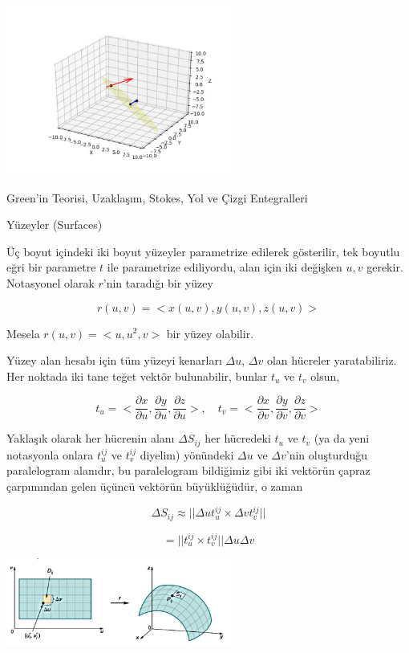 \documentclass[12pt,fleqn]{article}\usepackage{../../common}
\begin{document}
\includegraphics[width=20em]{calc_multi_75_app_07.jpg}

Green'in Teorisi, Uzaklaşım, Stokes, Yol ve Çizgi Entegralleri

Yüzeyler (Surfaces)

Üç boyut içindeki iki boyut yüzeyler parametrize edilerek gösterilir,
tek boyutlu eğri bir parametre $t$ ile parametrize ediliyordu, alan için
iki değişken $u,v$ gerekir. Notasyonel olarak $r$'nin taradığı bir yüzey

$$
r(u,v) = < x(u,v), y(u,v), z(u,v) >
$$

Mesela $r(u,v) = < u, u^2, v >$ bir yüzey olabilir.

Yüzey alan hesabı için tüm yüzeyi kenarları $\Delta u$, $\Delta v$ olan hücreler
yaratabiliriz. Her noktada iki tane teğet vektör bulunabilir, bunlar $t_u$ ve
$t_v$ olsun,

$$
t_u = < \frac{\partial x}{\partial u},
        \frac{\partial y}{\partial u},
        \frac{\partial z}{\partial u} >, \quad
t_v = < \frac{\partial x}{\partial v},
        \frac{\partial y}{\partial v},
        \frac{\partial z}{\partial v} >        
$$

Yaklaşık olarak her hücrenin alanı $\Delta S_{ij}$ her hücredeki $t_u$ ve $t_v$
(ya da yeni notasyonla onlara $t_u^{ij}$ ve $t_v^{ij}$ diyelim) yönündeki
$\Delta u$ ve $\Delta v$'nin oluşturduğu paralelogram alanıdır, bu paralelogram
bildiğimiz gibi iki vektörün çapraz çarpımından gelen üçüncü vektörün
büyüklüğüdür, o zaman 

$$
\Delta S_{ij} \approx || \Delta u t_u^{ij} \times \Delta v t_v^{ij} ||
$$

$$
= ||  t_u^{ij} \times t_v^{ij} || \Delta u \Delta v
$$
        
\includegraphics[width=20em]{calc_multi_75_app_01.jpg}
\end{document}
